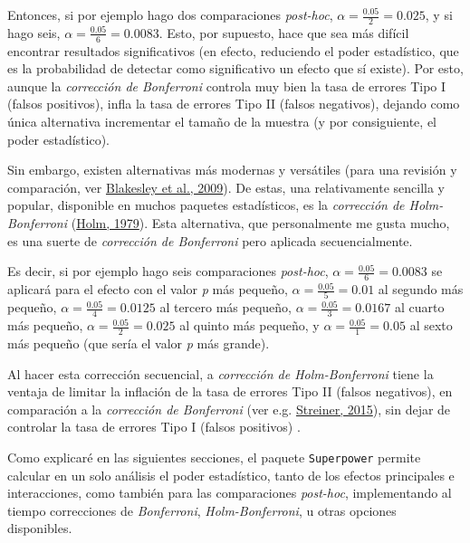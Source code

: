 \documentclass[
]{article}
\begin{document}
Entonces, si por ejemplo hago dos comparaciones \emph{post-hoc},
\(\alpha = \frac{0.05}{2} = 0.025\), y si hago seis,
\(\alpha = \frac{0.05}{6} = 0.0083\). Esto, por supuesto, hace que sea
más difícil encontrar resultados significativos (en efecto, reduciendo
el poder estadístico, que es la probabilidad de detectar como
significativo un efecto que sí existe). Por esto, aunque la
\emph{corrección de Bonferroni} controla muy bien la tasa de errores
Tipo I (falsos positivos), infla la tasa de errores Tipo II (falsos
negativos), dejando como única alternativa incrementar el tamaño de la
muestra (y por consiguiente, el poder estadístico).

Sin embargo, existen alternativas más modernas y versátiles (para una
revisión y comparación, ver
\protect\hyperlink{ref-blakesleyComparisonsMethodsMultiple2009}{Blakesley
et al., 2009}). De estas, una relativamente sencilla y popular,
disponible en muchos paquetes estadísticos, es la \emph{corrección de
Holm-Bonferroni}
(\protect\hyperlink{ref-holmSimpleSequentiallyRejective1979a}{Holm,
1979}). Esta alternativa, que personalmente me gusta mucho, es una
suerte de \emph{corrección de Bonferroni} pero aplicada secuencialmente.

Es decir, si por ejemplo hago seis comparaciones \emph{post-hoc},
\(\alpha = \frac{0.05}{6} = 0.0083\) se aplicará para el efecto con el
valor \emph{p} más pequeño, \(\alpha = \frac{0.05}{5} = 0.01\) al
segundo más pequeño, \(\alpha = \frac{0.05}{4} = 0.0125\) al tercero más
pequeño, \(\alpha = \frac{0.05}{3} = 0.0167\) al cuarto más pequeño,
\(\alpha = \frac{0.05}{2} = 0.025\) al quinto más pequeño, y
\(\alpha = \frac{0.05}{1} = 0.05\) al sexto más pequeño (que sería el
valor \emph{p} más grande).

Al hacer esta corrección secuencial, a \emph{corrección de
Holm-Bonferroni} tiene la ventaja de limitar la inflación de la tasa de
errores Tipo II (falsos negativos), en comparación a la \emph{corrección
de Bonferroni} (ver e.g.
\protect\hyperlink{ref-streinerBestOftforgottenPractices2015}{Streiner,
2015}), sin dejar de controlar la tasa de errores Tipo I (falsos
positivos) .

Como explicaré en las siguientes secciones, el paquete
\texttt{Superpower} permite calcular en un solo análisis el poder
estadístico, tanto de los efectos principales e interacciones, como
también para las comparaciones \emph{post-hoc}, implementando al tiempo
correcciones de \emph{Bonferroni}, \emph{Holm-Bonferroni}, u otras
opciones disponibles.
\end{document}

